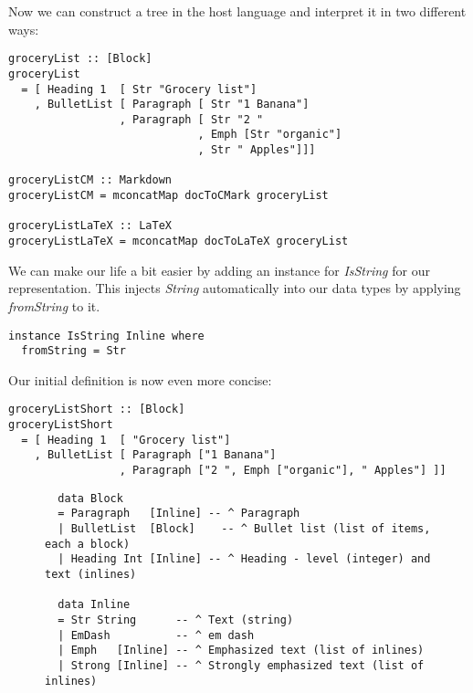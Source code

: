 \documentclass[format=acmsmall, review=true, screen=true, natbib=false]{acmart}
\begin{document}
Now we can construct a tree in the host language and interpret it in two
different ways:
\begin{lstlisting}
groceryList :: [Block]
groceryList
  = [ Heading 1  [ Str "Grocery list"]
    , BulletList [ Paragraph [ Str "1 Banana"]
                 , Paragraph [ Str "2 "
                             , Emph [Str "organic"]
                             , Str " Apples"]]]

groceryListCM :: Markdown
groceryListCM = mconcatMap docToCMark groceryList

groceryListLaTeX :: LaTeX
groceryListLaTeX = mconcatMap docToLaTeX groceryList
\end{lstlisting}

We can make our life a bit easier by adding an instance for \emph{IsString} for our
representation. This injects \emph{String} automatically into our data types by
applying \emph{fromString} to it.

\begin{lstlisting}
instance IsString Inline where
  fromString = Str
\end{lstlisting}


Our initial definition is now even more concise:

\begin{lstlisting}
groceryListShort :: [Block]
groceryListShort
  = [ Heading 1  [ "Grocery list"]
    , BulletList [ Paragraph ["1 Banana"]
                 , Paragraph ["2 ", Emph ["organic"], " Apples"] ]]
\end{lstlisting}

\begin{figure}
\begin{lstlisting}
  data Block
  = Paragraph   [Inline] -- ^ Paragraph
  | BulletList  [Block]    -- ^ Bullet list (list of items, each a block)
  | Heading Int [Inline] -- ^ Heading - level (integer) and text (inlines)
  
  data Inline
  = Str String      -- ^ Text (string)
  | EmDash          -- ^ em dash
  | Emph   [Inline] -- ^ Emphasized text (list of inlines)
  | Strong [Inline] -- ^ Strongly emphasized text (list of inlines)
\end{lstlisting}
\end{figure}
\end{document}
